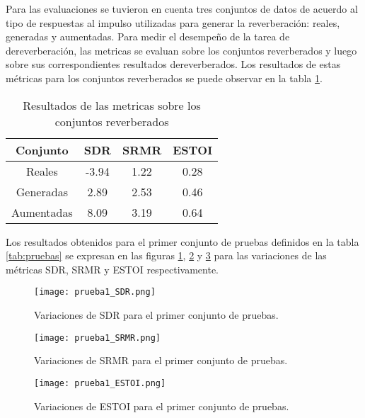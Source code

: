 Para las evaluaciones se tuvieron en cuenta tres conjuntos de datos de acuerdo al tipo de respuestas al impulso utilizadas para generar la reverberación: reales, generadas y aumentadas. Para medir el desempeño de la tarea de dereverberación, las metricas se evaluan sobre los conjuntos reverberados y luego sobre sus correspondientes resultados dereverberados. Los resultados de estas métricas para los conjuntos reverberados se puede observar en la tabla \ref{table:resultados_reverb}. 

\begin{table}[H]
\centering
\caption{Resultados de las metricas sobre los conjuntos reverberados}
\begin{tabular}{|c|c|c|c|}
\hline
Conjunto   & \textbf{SDR} & \textbf{SRMR} & \textbf{ESTOI} \\ \hline
Reales     & -3.94        & 1.22          & 0.28           \\
Generadas  & 2.89        & 2.53          & 0.46           \\
Aumentadas & 8.09        & 3.19          & 0.64           \\ \hline
\end{tabular}
\label{table:resultados_reverb}
\end{table}


Los resultados obtenidos para el primer conjunto de pruebas definidos en la tabla \ref{tab:pruebas} se expresan en las figuras \ref{fig:1_SDR}, \ref{fig:1_SRMR} y \ref{fig:1_ESTOI} para las variaciones de las métricas SDR, SRMR y ESTOI respectivamente. 

\begin{figure}[H]
	\centering{}
	\texttt{[image: prueba1\_SDR.png]}
	\caption{Variaciones de SDR para el primer conjunto de pruebas.}
	\label{fig:1_SDR}
\end{figure}

\begin{figure}[H]
	\centering{}
	\texttt{[image: prueba1\_SRMR.png]}
	\caption{Variaciones de SRMR para el primer conjunto de pruebas.}
	\label{fig:1_SRMR}
\end{figure}

\begin{figure}[H]
	\centering{}
	\texttt{[image: prueba1\_ESTOI.png]}
	\caption{Variaciones de ESTOI para el primer conjunto de pruebas.}
	\label{fig:1_ESTOI}
\end{figure}

